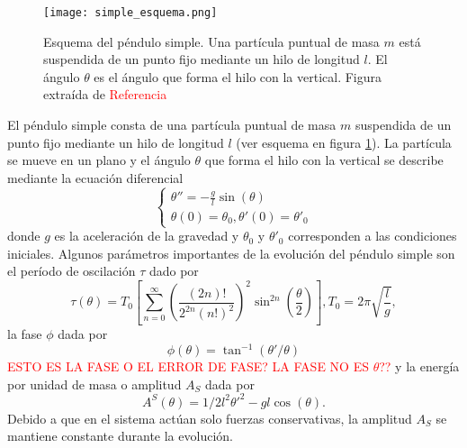 \documentclass[aps,prb,twocolumn,superscriptaddress,floatfix,longbibliography]{revtex4-2}
\newif\ifptitle
\newif\ifpnumber
\newcounter{para}
\newcommand\ptitle[1]{\par\refstepcounter{para}
{\ifpnumber{\noindent\textcolor{lightgray}{\textbf{\thepara}}\indent}\fi}
{\ifptitle{\textbf{[{#1}]}}\fi}}
\begin{document}
\ptitle{Presentar ecuaciones de la dinámica}

\begin{figure}[h]
  \texttt{[image: simple\_esquema.png]}
  \caption{Esquema del péndulo simple. Una partícula puntual de masa $m$ está suspendida de un punto fijo mediante un hilo de longitud $l$. El ángulo $\theta$ es el ángulo que forma el hilo con la vertical. Figura extraída de \textcolor{red}{Referencia}}
   \label{fig:simple_esquema}
\end{figure}

El péndulo simple consta de una partícula puntual de masa $m$ suspendida de un punto fijo mediante un hilo de longitud $l$ (ver esquema en figura \ref{fig:simple_esquema}). La partícula se mueve en un plano y el ángulo $\theta$ que forma el hilo con la vertical se describe mediante la ecuación diferencial
\begin{equation}
  \left\{\begin{matrix}
    \theta'' = -\frac{g}{l} \sin{(\theta)} \\
    \theta(0) = \theta_0, \theta'(0) = \theta'_0
   \end{matrix}\right.
  \label{eq:pendulo_simple}
\end{equation}
donde $g$ es la aceleración de la gravedad y $\theta_0$ y $\theta'_0$ corresponden a las condiciones iniciales. Algunos parámetros importantes de la evolución del péndulo simple son el período de oscilación $\tau$ dado por
\begin{equation}
  \tau(\theta) = T_0 \left [ \sum_{n = 0}^\infty \left(  \frac{(2n)!}{2^{2n}(n!)^2} \right )^2 \sin^{2n} \left ( \frac{\theta}{2} \right )   \right ], T_0 = 2 \pi \sqrt{\frac{l}{g}},
  \label{eq:periodo_simple}
\end{equation}
la fase $\phi$ dada por
\begin{equation}
  \phi(\theta) = \tan^{-1}(\theta'/\theta)
  \label{eq:fase_simple}
\end{equation}
\textcolor{red}{ESTO ES LA FASE O EL ERROR DE FASE? LA FASE NO ES $\theta$??} y la energía por unidad de masa o amplitud $A_S$ dada por
\begin{equation}
  A^S(\theta) = 1/2 l^2 \theta'^2 - g l \cos{(\theta)}.
  \label{eq:amplitud_simple}
\end{equation}
Debido a que en el sistema actúan solo fuerzas conservativas, la amplitud $A_S$ se mantiene constante durante la evolución.
\end{document}

